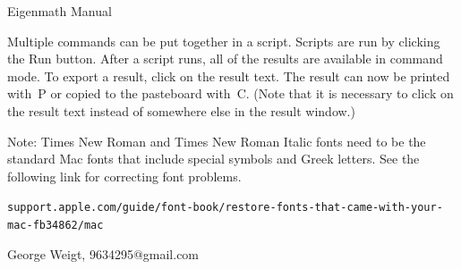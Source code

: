 

\begin{center}
{\LARGE Eigenmath Manual}
\end{center}

\begin{center}
\end{center}

Multiple commands can be put together in a script.
Scripts are run by clicking the Run button.
After a script runs, all of the results are available in command mode.
To export a result, click on the result text.
The result can now be printed with \cmd$\,$P or copied to the pasteboard with \cmd$\,$C.
(Note that it is necessary to click on the result text
instead of somewhere else in the result window.)

\bigskip
Note: Times New Roman and Times New Roman Italic fonts need
to be the standard Mac fonts that include special symbols and Greek letters.
See the following link for correcting font problems.

\bigskip
{\footnotesize\verb$support.apple.com/guide/font-book/restore-fonts-that-came-with-your-mac-fb34862/mac$}

\vfill
George Weigt, 9634295@gmail.com

\newpage

\tableofcontents


